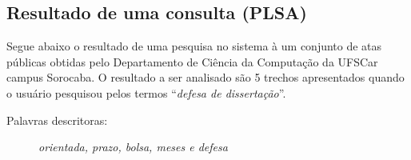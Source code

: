 \newpage

\subsection*{Resultado de uma consulta (PLSA)}

Segue abaixo o resultado de uma pesquisa no sistema à um conjunto de atas públicas obtidas pelo Departamento de Ciência da Computação da UFSCar campus Sorocaba. O resultado a ser analisado são 5 trechos apresentados quando o usuário pesquisou pelos termos ``\textit{defesa de dissertação}''.

\vspace{0.5 cm}

\begin{description}
	\item[Palavras descritoras: ] \textit{orientada, prazo, bolsa, meses e defesa}
\end{description}


